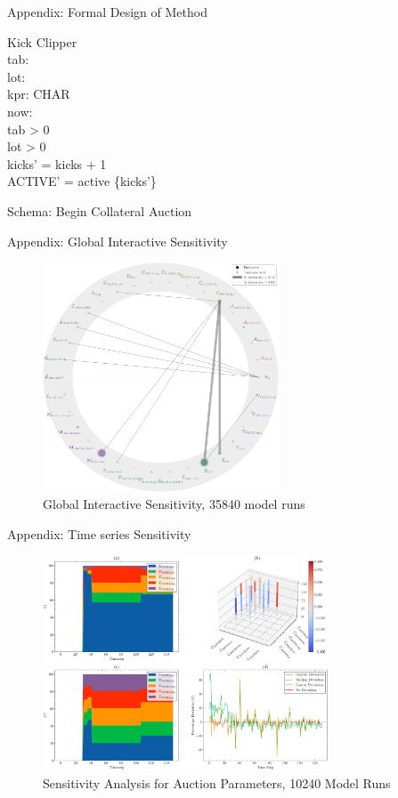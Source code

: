 \documentclass{beamer}
\begin{document}
\begin{frame}{Appendix: Formal Design of Method}
\begin{schema}{Kick}
\Delta Clipper \\
tab: \real \\
lot: \real \\
kpr: \seq CHAR \\
now: \nat \\
\where
tab > 0 \\
lot > 0 \\
kicks' = kicks + 1 \\
ACTIVE' = active \cup \{kicks'\} \\
\end{schema}

\centering
\normalsize{Schema: Begin Collateral Auction}
\vfill  %
\end{frame}


\begin{frame}{Appendix: Global Interactive Sensitivity}
\begin{figure}
\centering
\includegraphics[width=70mm]{Figs/Sobol' Sensitivity Analysis, 35840 model runs.pdf}
\caption{Global Interactive Sensitivity, 35840 model runs}
\label{fig3}
\end{figure}
\end{frame}

\begin{frame}{Appendix: Time series Sensitivity}
\begin{figure}
\centering
\includegraphics[width=85mm]{Figs/SOBOL_time_series_for_problem_cliplike_n10.pdf}
\caption{Sensitivity Analysis for Auction Parameters, 10240 Model Runs}
\label{fig4}
\end{figure}
\end{frame}
\end{document}
